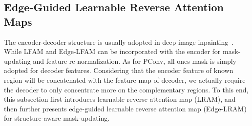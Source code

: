 \documentclass[10pt,journal,compsoc]{IEEEtran}
\begin{document}

%

%

\subsection{Edge-Guided Learnable Reverse Attention Maps}\label{sec5}
%
The encoder-decoder structure is usually adopted in deep image inpainting~\cite{pathakCVPR16context, song_contextual_2018,Yan_2018_Shift}.
%
While LFAM and Edge-LFAM can be incorporated with the encoder for mask-updating and feature re-normalization.
%
As for PConv, all-ones mask is simply adopted for decoder features.
%
Considering that the encoder feature of known region will be concatenated with the feature map of decoder, we actually require the decoder to only concentrate more on the complementary regions.
%
To this end, this subsection first introduces learnable reverse attention map (LRAM), and then further presents edge-guided learnable reverse attention map (Edge-LRAM) for structure-aware mask-updating.
\end{document}
